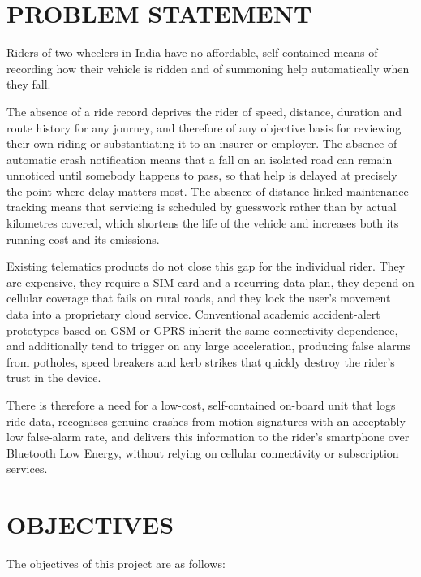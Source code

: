 \documentclass[12pt,a4paper,oneside]{report}
\begin{document}
\section{PROBLEM STATEMENT}

Riders of two-wheelers in India have no affordable, self-contained means of recording how
their vehicle is ridden and of summoning help automatically when they fall.

The absence of a ride record deprives the rider of speed, distance, duration and route
history for any journey, and therefore of any objective basis for reviewing their own riding
or substantiating it to an insurer or employer. The absence of automatic crash notification
means that a fall on an isolated road can remain unnoticed until somebody happens to pass,
so that help is delayed at precisely the point where delay matters most. The absence of
distance-linked maintenance tracking means that servicing is scheduled by guesswork rather
than by actual kilometres covered, which shortens the life of the vehicle and increases both
its running cost and its emissions.

Existing telematics products do not close this gap for the individual rider. They are
expensive, they require a SIM card and a recurring data plan, they depend on cellular
coverage that fails on rural roads, and they lock the user's movement data into a
proprietary cloud service. Conventional academic accident-alert prototypes based on
GSM or GPRS inherit the same connectivity dependence, and additionally tend to trigger on
any large acceleration, producing false alarms from potholes, speed breakers and kerb
strikes that quickly destroy the rider's trust in the device.

There is therefore a need for a low-cost, self-contained on-board unit that logs ride data,
recognises genuine crashes from motion signatures with an acceptably low false-alarm rate,
and delivers this information to the rider's smartphone over Bluetooth Low Energy, without
relying on cellular connectivity or subscription services.

\section{OBJECTIVES}

The objectives of this project are as follows:
\end{document}

